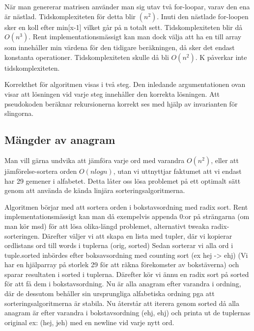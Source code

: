 \documentclass[11pt,a4paper,article,oneside]{memoir}
\begin{document}
När man genererar matrisen använder man sig utav två for-loopar, varav den ena är nästlad. Tidskomplexiteten för detta blir $(n^2)$.
Inuti den nästlade for-loopen sker en koll efter min[x-1] vilket går på n totalt sett. Tidskomplexiteten blir då $O(n^3)$. Rent implementationsmässigt
kan man dock välja att ha en till array som innehåller min värdena för den tidigare beräkningen, då sker det endast konstanta operationer. Tidskomplexiteten
skulle då bli $O(n^2)$. K påverkar inte tidskomplexiteten.

Korrekthet för algoritmen visas i två steg. Den inledande argumentationen ovan visar att lösningen vid varje steg innehåller den korrekta 
lösningen. Att pseudokoden beräknar rekursionerna korrekt ses med hjälp av invarianten för slingorna.

\newpage

\subsection{Mängder av anagram}

Man vill gärna undvika att jämföra varje ord med varandra $O(n^2)$, eller att jämförelse-sortera orden $O(nlogn)$, utan vi 
uttnyttjar faktumet att vi endast har 29 gemener i alfabetet.
Detta låter oss lösa problemet på ett optimalt sätt genom att använda de kända linjära sorteringsalgoritmerna.

Algoritmen börjar med att sortera orden i bokstavsordning med radix sort. Rent implementationsmässigt kan man då exempelvis 
appenda 0:or på strängarna (om man kör msd) för att lösa olika-längd problemet, alternativt tweaka radix-sorteringen. 
Därefter väljer vi att skapa en lista med tupler, där vi kopierar ordlistans ord till words i tuplerna (orig, sorted)
Sedan sorterar vi alla ord i tuple.sorted inbördes efter boksavsordning med counting sort (ex hej -> ehj)
(Vi har en hjälparray på storlek 29 för att räkna förekomster av bokstäverna) och sparar resultaten i sorted i tuplerna.
Därefter kör vi ännu en radix sort på sorted för att få dem i bokstavsordning. Nu är alla anagram efter varandra i ordning,
där de dessutom behåller sin ursprungliga alfabetiska ordning pga att sorteringsalgoritmerna är stabila. Nu återstår att
iterera genom sorted då alla anagram är efter varandra i bokstavsordning (ehj, ehj) och printa ut de tuplernas original ex: (hej, jeh)
med en newline vid varje nytt ord.
\end{document}
